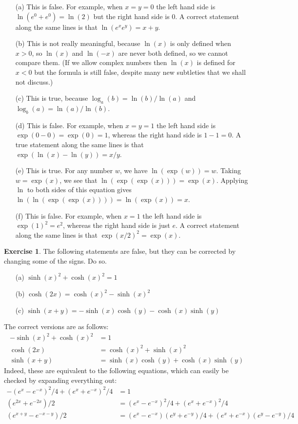 \documentclass[a4paper]{amsart}
\theoremstyle{definition}
\newtheorem{exercise}{Exercise}[section]
\newenvironment{solution}{{\noindent \bf Solution:}}{}
\begin{document}
\begin{solution}
\begin{itemize}
  \item[(a)] This is false.  For example, when $x=y=0$ the left hand
   side is $\ln(e^0+e^0)=\ln(2)$ but the right hand side is $0$.  A
   correct statement along the same lines is that $\ln(e^xe^y)=x+y$.
  \item[(b)] This is not really meaningful, because $\ln(x)$ is only
   defined when $x>0$, so $\ln(x)$ and $\ln(-x)$ are never both
   defined, so we cannot compare them.  (If we allow complex numbers
   then $\ln(x)$ is defined for $x<0$ but the formula is still false,
   despite many new subtleties that we shall not discuss.)
  \item[(c)] This is true, because $\log_a(b)=\ln(b)/\ln(a)$ and
   $\log_b(a)=\ln(a)/\ln(b)$. 
  \item[(d)] This is false.  For example, when $x=y=1$ the left hand
   side is $\exp(0-0)=\exp(0)=1$, whereas the right hand side is
   $1-1=0$.  A true statement along the same lines is that
   $\exp(\ln(x)-\ln(y))=x/y$. 
  \item[(e)] This is true.  For any number $w$, we have
   $\ln(\exp(w))=w$.  Taking $w=\exp(x)$, we see that
   $\ln(\exp(\exp(x)))=\exp(x)$.  Applying $\ln$ to both sides of this
   equation gives $\ln(\ln(\exp(\exp(x))))=\ln(\exp(x))=x$.
  \item[(f)] This is false.  For example, when $x=1$ the left hand
   side is $\exp(1)^2=e^2$, whereas the right hand side is just $e$.
   A correct statement along the same lines is that
   $\exp(x/2)^2=\exp(x)$. 
 \end{itemize}
\end{solution}
\begin{exercise}\label{ex-hyp-signs}
The following statements are false, but they can be corrected by
 changing some of the signs.  Do so.
 \begin{itemize}
  \item[(a)] $\sinh(x)^2+\cosh(x)^2=1$
  \item[(b)] $\cosh(2x)=\cosh(x)^2-\sinh(x)^2$
  \item[(c)] $\sinh(x+y)=-\sinh(x)\cosh(y)-\cosh(x)\sinh(y)$
 \end{itemize}
\end{exercise}
\begin{solution}
The correct versions are as follows:
 \begin{align*}
  -\sinh(x)^2 + \cosh(x)^2 &= 1 \\
  \cosh(2x) &= \cosh(x)^2 + \sinh(x)^2 \\
  \sinh(x+y) &= \sinh(x)\cosh(y)+\cosh(x)\sinh(y)
 \end{align*}
 Indeed, these are equivalent to the following equations, which can
 easily be checked by expanding everything out:
 \begin{align*}
  -(e^x-e^{-x})^2/4 + (e^x+e^{-x})^2/4 &= 1 \\
  (e^{2x}+e^{-2x})/2 &= (e^x-e^{-x})^2/4 + (e^x+e^{-x})^2/4 \\
  (e^{x+y}-e^{-x-y})/2 &= (e^x-e^{-x})(e^y+e^{-y})/4 + 
                          (e^x+e^{-x})(e^y-e^{-y})/4 
 \end{align*}
\end{solution}
\end{document}
